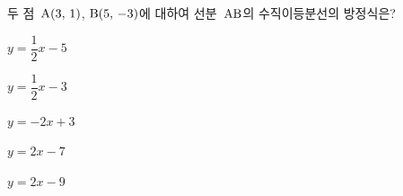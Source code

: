 두 점~$\mathrm{A}(3,\,1)$, $\mathrm{B}(5,\,-3)$에 대하여 선분~$\mathrm{AB}$의 수직이등분선의 방정식은?
\begin{choices32}{\rule[-3ex]{0pt}{8ex}$y=\dfrac{1}{2}x-5$}{\rule[-3ex]{0pt}{8ex}$y=\dfrac{1}{2}x-3$}{\rule[-3ex]{0pt}{8ex}$y=-2x+3$}{\rule[-3ex]{0pt}{8ex}$y=2x-7$}{\rule[-3ex]{0pt}{8ex}$y=2x-9$}\end{choices32}
